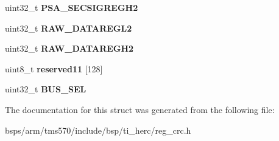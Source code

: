 \begin{DoxyCompactItemize}
uint32\+\_\+t {\bfseries P\+S\+A\+\_\+\+S\+E\+C\+S\+I\+G\+R\+E\+G\+H2}
\item 
\mbox{\label{structtms570__crc__t_a7df0f1cf3399c38f9b63ad11f7d9675a}} 
uint32\+\_\+t {\bfseries R\+A\+W\+\_\+\+D\+A\+T\+A\+R\+E\+G\+L2}
\item 
\mbox{\label{structtms570__crc__t_a82ef0a3dad7a462d63724e128c3c4ac9}} 
uint32\+\_\+t {\bfseries R\+A\+W\+\_\+\+D\+A\+T\+A\+R\+E\+G\+H2}
\item 
\mbox{\label{structtms570__crc__t_aacbbd9b1dde893491f32fbbc4f819562}} 
uint8\+\_\+t {\bfseries reserved11} \mbox{[}128\mbox{]}
\item 
\mbox{\label{structtms570__crc__t_aac966476fd32c39a6119921e42a26ae0}} 
uint32\+\_\+t {\bfseries B\+U\+S\+\_\+\+S\+EL}
\end{DoxyCompactItemize}


The documentation for this struct was generated from the following file\+:\begin{DoxyCompactItemize}
\item 
bsps/arm/tms570/include/bsp/ti\+\_\+herc/reg\+\_\+crc.\+h\end{DoxyCompactItemize}
